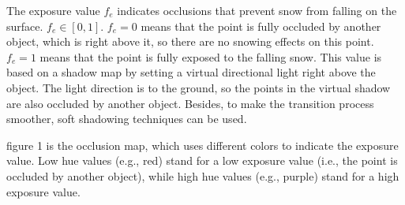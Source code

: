 \documentclass{article}
\begin{document}
The exposure value \( f_{e} \) indicates occlusions that prevent snow from falling on the surface. %
\( f_{e} \in [0, 1] \). \( f_{e}=0 \) means that the point is fully occluded by another object, which is right 
above it, so there are no snowing effects on this point. \( f_{e}=1 \) means that the point is fully exposed to the 
falling snow. This value is based on a shadow map by setting a virtual directional light right above the object. 
The light direction is to the ground, so the points in the virtual shadow are also occluded by another object. 
Besides, to make the transition process smoother, soft shadowing techniques can be used. 

figure 1 is the occlusion map, which uses different colors to indicate the exposure value. Low hue 
values (e.g., red) stand for a low exposure value (i.e., the point is occluded by another object), while high hue 
values (e.g., purple) stand for a high exposure value.
\end{document}
